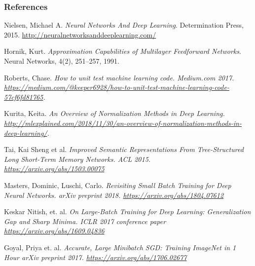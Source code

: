 \documentclass{beamer}
\begin{document}
%   
   \begin{frame}[allowframebreaks]
   	\frametitle{References}
   	\begin{thebibliography}{Hornik, 1991}

   Nielsen, Michael A. {\em Neural Networks And Deep Learning}. Determination Press, 2015. \url{http://neuralnetworksanddeeplearning.com/}
  
   Hornik, Kurt. {\em Approximation Capabilities of Multilayer Feedforward Networks}. Neural Networks, 4(2), 251--257, 1991.
  
   Roberts, Chase. \em{How to unit test machine learning code.} Medium.com 2017. \url{https://medium.com/@keeper6928/how-to-unit-test-machine-learning-code-57cf6fd81765}.  
  
   Kurita, Keita. \em{An Overview of Normalization Methods in Deep Learning.} \url{http://mlexplained.com/2018/11/30/an-overview-of-normalization-methods-in-deep-learning/}.
  
   Tai, Kai Sheng et al. \em{Improved Semantic Representations From Tree-Structured Long Short-Term Memory Networks.} ACL 2015. \url{https://arxiv.org/abs/1503.00075}
   
   Masters, Dominic, Luschi, Carlo. \em{Revisiting Small Batch Training for Deep Neural Networks.} arXiv preprint 2018. \url{https://arxiv.org/abs/1804.07612}
  
   Keskar Nitish, et. al. \em{On Large-Batch Training for Deep Learning: Generalization Gap and Sharp Minima}.  ICLR 2017 conference paper \url{https://arxiv.org/abs/1609.04836}
  
   Goyal, Priya et. al. \em{Accurate, Large Minibatch SGD: Training ImageNet in 1 Hour} arXiv preprint 2017. \url{https://arxiv.org/abs/1706.02677}
   
	\end{thebibliography}   
   \end{frame}  
\end{document}
